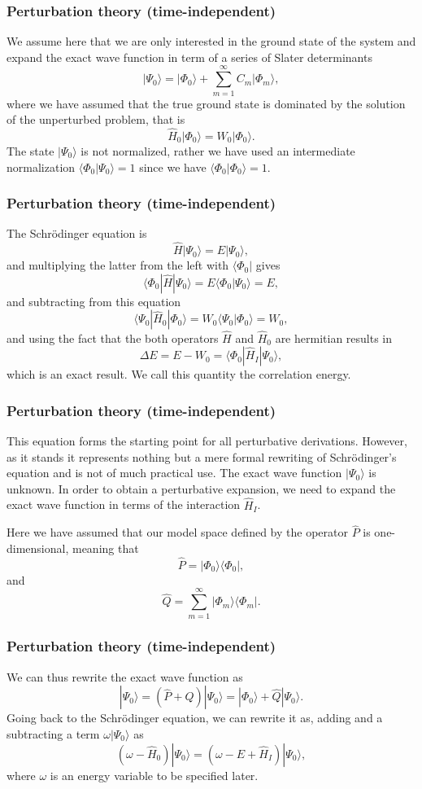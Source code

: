 \frame
{
\frametitle{Perturbation theory (time-independent)}
\begin{small}
{\scriptsize
We assume here that we are only interested in the ground state of the system and 
expand the exact wave function in term of a series of Slater determinants
\[
|\Psi_0\rangle = |\Phi_0\rangle + \sum_{m=1}^{\infty}C_m|\Phi_m\rangle,
\]
where we have assumed that the true ground state is dominated by the 
solution of the unperturbed problem, that is
\[
\hat{H}_0|\Phi_0\rangle= W_0|\Phi_0\rangle.
\]
The state $|\Psi_0\rangle$ is not normalized, rather we have used an intermediate 
normalization $\langle \Phi_0 |\Psi_0\rangle=1$ since we have $\langle \Phi_0|\Phi_0\rangle=1$. 
}
\end{small}
}


\frame
{
\frametitle{Perturbation theory (time-independent)}
\begin{small}
{\scriptsize
The Schr\"odinger equation is
\[
\hat{H}|\Psi_0\rangle = E|\Psi_0\rangle,
\]
and multiplying the latter from the left with $\langle \Phi_0|$ gives
\[
\langle \Phi_0|\hat{H}|\Psi_0\rangle = E\langle \Phi_0|\Psi_0\rangle=E,
\]
and subtracting from this equation
\[
\langle \Psi_0|\hat{H}_0|\Phi_0\rangle= W_0\langle \Psi_0|\Phi_0\rangle=W_0,
\]
and using the fact that the both operators $\hat{H}$ and $\hat{H}_0$ are hermitian 
results in
\[
\Delta E=E-W_0=\langle \Phi_0|\hat{H}_I|\Psi_0\rangle,
\]
which is an exact result. We call this quantity the correlation energy.
}
\end{small}
}


\frame
{
\frametitle{Perturbation theory (time-independent)}
\begin{small}
{\scriptsize
This equation forms the starting point for all perturbative derivations. However,
as it stands it represents nothing but a mere formal rewriting of Schr\"odinger's equation and is not of much practical use. The exact wave function $|\Psi_0\rangle$ is unknown. In order to obtain a perturbative expansion, we need to expand the exact wave function in terms of the interaction $\hat{H}_I$. 

Here we have assumed that our model space defined by the operator $\hat{P}$ is one-dimensional, meaning that
\[
\hat{P}= |\Phi_0\rangle \langle \Phi_0|,
\]
and 
\[
\hat{Q}=\sum_{m=1}^{\infty}|\Phi_m\rangle \langle \Phi_m|.
\]
}
\end{small}
}


\frame
{
\frametitle{Perturbation theory (time-independent)}
\begin{small}
{\scriptsize
We can thus rewrite the exact wave function as
\[
|\Psi_0\rangle= (\hat{P}+\hat{Q})|\Psi_0\rangle=|\Phi_0\rangle+\hat{Q}|\Psi_0\rangle.
\]
Going back to the Schr\"odinger equation, we can rewrite it as, adding and a subtracting a term $\omega |\Psi_0\rangle$ as
\[
\left(\omega-\hat{H}_0\right)|\Psi_0\rangle=\left(\omega-E+\hat{H}_I\right)|\Psi_0\rangle,
\]
where $\omega$ is an energy variable to be specified later. 
}
\end{small}
}


